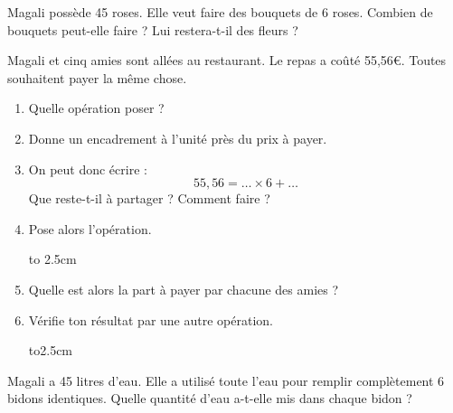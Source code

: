 \begin{myenumerate}
\item Magali possède 45 roses. Elle veut faire des bouquets de 6
roses. Combien de bouquets peut-elle faire ? Lui restera-t-il des
fleurs ?
\par{}
\item Magali et cinq amies sont allées au restaurant. Le repas a coûté
55,56\textgreek{\euro}. Toutes souhaitent payer la même chose.
  \begin{enumerate}
  \item Quelle opération poser ?\dotfill\par\dotfill
  \item Donne un encadrement à l'unité près du prix à
payer.\dotfill\par\dotfill
  \item On peut donc écrire :
\[55,56=\ldots\times6+\ldots\]
Que reste-t-il à partager ? Comment faire ?\dotfill\par\dotfill
\item Pose alors l'opération.\par\vbox to 2.5cm{}\par
\item Quelle est alors la part à payer par chacune des amies ?\dotfill\par\dotfill\par\dotfill
\item Vérifie ton résultat par une autre opération.\par
\vbox to2.5cm{}\par
  \end{enumerate}
\item Magali a 45 litres d'eau. Elle a utilisé toute l'eau pour
remplir complètement 6 bidons identiques. Quelle quantité d'eau
a-t-elle mis dans chaque bidon ?\par{}
\end{myenumerate}
